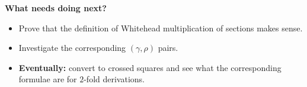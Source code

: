 \bigskip\noindent
{\bf What needs doing next?}
\begin{itemize}
\item
Prove that the definition of Whitehead multiplication of sections
makes sense.
\item
Investigate the corresponding $(\gamma,\rho)$ pairs.
\item
{\bf Eventually:} convert to crossed squares and see what
the corresponding formulae are for $2$-fold derivations.
\end{itemize}

